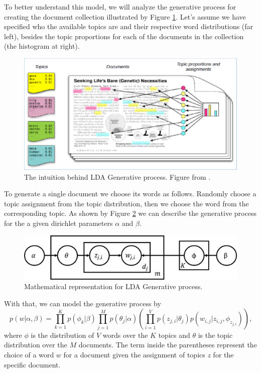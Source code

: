 	To better understand this model, we will analyze the generative process for creating the document collection illustrated by Figure \ref{fig:lda-generative-process}. Let's assume we have specified who the available topics are and their respective word distributions (far left), besides the topic proportions for each of the documents in the collection (the histogram at right).

	\begin{figure}[h!]
		\centering
		\includegraphics[width=\linewidth]{01.Chapters/02.Background/The-intuition-behind-LDA-Generative-process-by-D-Blei-17}
		\caption{The intuition behind LDA Generative process. Figure from  .}
		\label{fig:lda-generative-process}
	\end{figure}

	To generate a single document we choose its words as follows. Randomly choose a topic assignment from the topic distribution, then we choose the word from the corresponding topic. As shown by Figure \ref{fig:generative-probs} we can describe the generative process for the a given dirichlet parameters $\alpha$ and $\beta$.

	\begin{figure}[h!]
		\centering
		\includegraphics[width=0.7\linewidth]{01.Chapters/02.Background/generative-probs}
		\caption{Mathematical representation for LDA Generative process.}
		\label{fig:generative-probs}
	\end{figure}

	With that, we can model the generative process by
	\begin{equation}
		\label{eq:generative-lda}
		p(w|\alpha, \beta) = \prod_{k=1}^{K} p(\phi_{k}|\beta) \prod_{j=1}^{M} p(\theta_{j}|\alpha) \left( \prod_{i=1}^{V}p(z_{j,i}|\theta_{j}) p(w_{i,j}|z_{i,j},\phi_{z_{j,i}})  \right) \text{,}
	\end{equation}
	where $\phi$ is the distribution of $V$ words over the $K$ topics and $\theta$ is the topic distribution over the $M$ documents. The term inside the parentheses represent the choice of a word $w$ for a document given the assignment of topics $z$ for the specific document.

